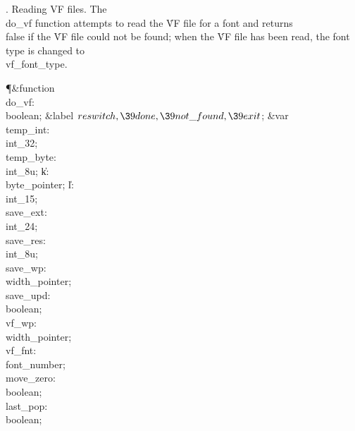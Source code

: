 .  Reading VF files.
The \\{do\_vf} function attempts to read the \.{VF} file for a font and
returns \\{false} if the \.{VF} file could not be found; when the \.{VF}
file has been read, the font type is changed to \\{vf\_font\_type}.

\Y\P\4\&{function}\1\  \\{do\_vf}: \\{boolean};\6
\4\&{label} $\\{reswitch},\39\\{done},\39\\{not\_found},\39\\{exit}$;\6
\4\&{var} \\{temp\_int}: \\{int\_32};\6
\\{temp\_byte}: \\{int\_8u};\6
\|k: \\{byte\_pointer};\6
\|l: \\{int\_15};\6
\\{save\_ext}: \\{int\_24};\6
\\{save\_res}: \\{int\_8u};\6
\\{save\_wp}: \\{width\_pointer};\6
\\{save\_upd}: \\{boolean};\6
\\{vf\_wp}: \\{width\_pointer};\6
\\{vf\_fnt}: \\{font\_number};\6
\\{move\_zero}: \\{boolean};\6
\\{last\_pop}: \\{boolean};\2\6
